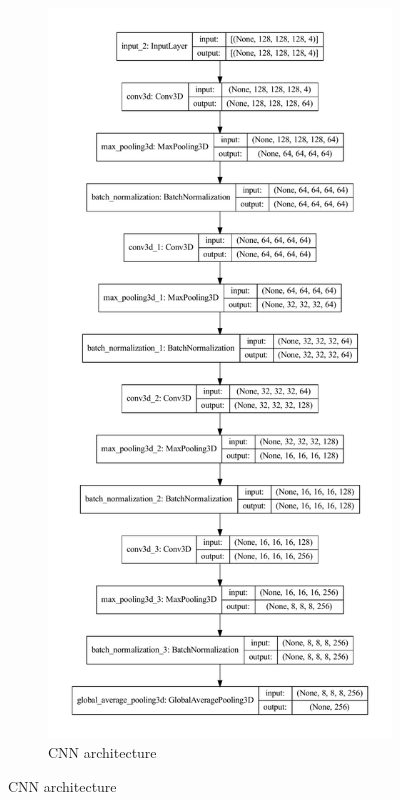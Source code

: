 \documentclass[fleqn,10pt]{wlscirep}
\begin{document}
\begin{figure}[tbp]
\begin{subfigure}[t]{0.4\textwidth}
    \includegraphics[width=\linewidth]{deep-learning-qc/image_model.pdf}
    \caption{CNN architecture}
    \label{fig:dl-architecture:cnn}

\end{subfigure}
\end{figure}
\end{document}
